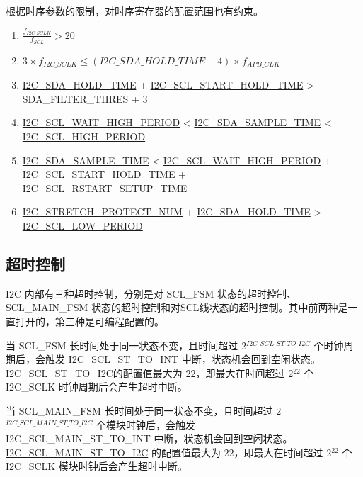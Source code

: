 \documentclass[main\_\_CN.tex]{subfiles}
\begin{document}
根据时序参数的限制，对时序寄存器的配置范围也有约束。
\begin{enumerate}
\item $\frac{f_{I2C\_SCLK}}{f_{SCL}} > 20$
\item $3 \times f_{I2C\_SCLK} \leq (\hyperref[fielddesc:I2CSDAHOLDTIME]{I2C\_SDA\_HOLD\_TIME}-4) \times f_{APB\_CLK}$
\item \hyperref[fielddesc:I2CSDAHOLDTIME]{I2C\_SDA\_HOLD\_TIME} + \hyperref[fielddesc:I2CSCLSTARTHOLDTIME]{I2C\_SCL\_START\_HOLD\_TIME} > SDA\_FILTER\_THRES + 3
\item \hyperref[fielddesc:I2CSCLWAITHIGHPERIOD]{I2C\_SCL\_WAIT\_HIGH\_PERIOD} < \hyperref[fielddesc:I2CSDASAMPLETIME]{I2C\_SDA\_SAMPLE\_TIME} < \hyperref[fielddesc:I2CSCLHIGHPERIOD]{I2C\_SCL\_HIGH\_PERIOD}
\item \hyperref[fielddesc:I2CSDASAMPLETIME]{I2C\_SDA\_SAMPLE\_TIME} < \hyperref[fielddesc:I2CSCLWAITHIGHPERIOD]{I2C\_SCL\_WAIT\_HIGH\_PERIOD} + \hyperref[fielddesc:I2CSCLSTARTHOLDTIME]{I2C\_SCL\_START\_HOLD\_TIME} + \\\hyperref[fielddesc:I2CSCLRSTARTSETUPTIME]{I2C\_SCL\_RSTART\_SETUP\_TIME}
\item \hyperref[fielddesc:I2CSTRETCHPROTECTNUM]{I2C\_STRETCH\_PROTECT\_NUM} + \hyperref[fielddesc:I2CSDAHOLDTIME]{I2C\_SDA\_HOLD\_TIME} > \hyperref[fielddesc:I2CSCLLOWPERIOD]{I2C\_SCL\_LOW\_PERIOD}
\end{enumerate}

\subsection{超时控制}
I2C 内部有三种超时控制，分别是对 SCL\_FSM 状态的超时控制、SCL\_MAIN\_FSM 状态的超时控制和对SCL线状态的超时控制。其中前两种是一直打开的，第三种是可编程配置的。

当 SCL\_FSM 长时间处于同一状态不变，且时间超过 2$^{\hyperref[fielddesc:I2CSCLSTTOI2C]{I2C\_SCL\_ST\_TO\_I2C}}$ 个时钟周期后，会触发 I2C\_SCL\_ST\_TO\_INT 中断，状态机会回到空闲状态。\hyperref[fielddesc:I2CSCLSTTOI2C]{I2C\_SCL\_ST\_TO\_I2C}的配置值最大为 22，即最大在时间超过 2$^{22}$ 个 I2C\_SCLK 时钟周期后会产生超时中断。

当 SCL\_MAIN\_FSM 长时间处于同一状态不变，且时间超过 2$^{\hyperref[fielddesc:I2CSCLMAINSTTOI2C]{I2C\_SCL\_MAIN\_ST\_TO\_I2C}}$ 个模块时钟后，会触发 \\I2C\_SCL\_MAIN\_ST\_TO\_INT 中断，状态机会回到空闲状态。\hyperref[fielddesc:I2CSCLMAINSTTOI2C]{I2C\_SCL\_MAIN\_ST\_TO\_I2C} 的配置值最大为 22，即最大在时间超过 2$^{22}$ 个 I2C\_SCLK 模块时钟后会产生超时中断。
\end{document}
